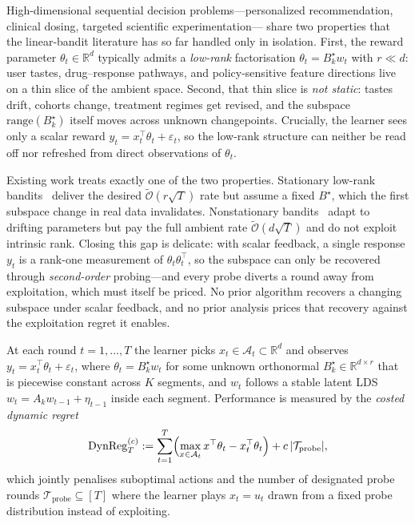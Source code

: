 \documentclass{article}
\newcommand{\R}{\mathbb{R}}
\newcommand{\cA}{\mathcal{A}}
\newcommand{\cTprobe}{\mathcal{T}_{\mathrm{probe}}}
\newcommand{\tilO}{\widetilde{\mathcal{O}}}
\newcommand{\DynReg}{\mathrm{DynReg}}
\newcommand{\range}{\mathrm{range}}
\begin{document}
High-dimensional sequential decision problems---personalized
recommendation, clinical dosing, targeted scientific experimentation---
share two properties that the linear-bandit literature has so far
handled only in isolation. First, the reward parameter $\theta_t\in\R^d$
typically admits a \emph{low-rank} factorisation $\theta_t=B_k^\star w_t$
with $r\ll d$: user tastes, drug--response pathways, and policy-sensitive
feature directions live on a thin slice of the ambient space. Second,
that thin slice is \emph{not static}: tastes drift, cohorts change,
treatment regimes get revised, and the subspace $\range(B_k^\star)$
itself moves across unknown changepoints. Crucially, the learner sees
only a scalar reward $y_t=x_t^\top\theta_t+\varepsilon_t$, so the
low-rank structure can neither be read off nor refreshed from direct
observations of $\theta_t$.

Existing work treats exactly one of the two properties.
Stationary low-rank
bandits~\citep{jun2019bilinear,pmlr-v235-jedra24a,lu2021lowrank}
deliver the desired $\tilO(r\sqrt T)$ rate but assume a fixed $B^\star$,
which the first subspace change in real data invalidates.
Nonstationary bandits~\citep{russac2019weighted,cheung2019learning}
adapt to drifting parameters but pay the full ambient rate
$\tilO(d\sqrt T)$ and do not exploit intrinsic rank. Closing this gap is
delicate: with scalar feedback, a single response $y_t$ is a rank-one
measurement of $\theta_t\theta_t^\top$, so the subspace can only be
recovered through \emph{second-order} probing---and every probe diverts
a round away from exploitation, which must itself be priced. No prior
algorithm recovers a changing subspace under scalar feedback, and no
prior analysis prices that recovery against the exploitation regret it
enables.

At each round $t = 1,\dots,T$ the learner picks $x_t \in \cA_t
\subset \R^d$ and observes $y_t = x_t^\top \theta_t + \varepsilon_t$,
where $\theta_t = B_k^\star w_t$ for some unknown orthonormal
$B_k^\star \in \R^{d\times r}$ that is piecewise constant across $K$
segments, and $w_t$ follows a stable latent LDS $w_t = A_k w_{t-1} +
\eta_{t-1}$ inside each segment. Performance is measured by the
\emph{costed dynamic regret}
\begin{equation}
\DynReg_T^{(c)} := \sum_{t=1}^T \Bigl(\max_{x\in\cA_t} x^\top \theta_t
  - x_t^\top \theta_t\Bigr) + c\,|\cTprobe|,
\label{eq:intro_costed_regret}
\end{equation}
which jointly penalises suboptimal actions and the number of
designated probe rounds $\cTprobe\subseteq[T]$ where the learner
plays $x_t = u_t$ drawn from a fixed probe distribution instead of
exploiting.
\end{document}
